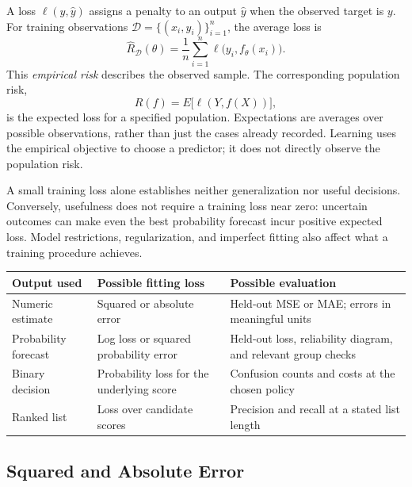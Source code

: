 A loss $\ell(y,\hat y)$ assigns a penalty to an output $\hat y$ when the observed target is $y$. For training observations $\mathcal D=\{(x_i,y_i)\}_{i=1}^n$, the average loss is
\[
\hat R_{\mathcal D}(\theta)=\frac1n\sum_{i=1}^n
\ell\bigl(y_i,f_\theta(x_i)\bigr).
\]
This \emph{empirical risk} describes the observed sample. The corresponding population risk,
\[
R(f)=E\bigl[\ell(Y,f(X))\bigr],
\]
is the expected loss for a specified population. Expectations are averages over possible observations, rather than just the cases already recorded. Learning uses the empirical objective to choose a predictor; it does not directly observe the population risk.

A small training loss alone establishes neither generalization nor useful decisions. Conversely, usefulness does not require a training loss near zero: uncertain outcomes can make even the best probability forecast incur positive expected loss. Model restrictions, regularization, and imperfect fitting also affect what a training procedure achieves.

\par\addvspace{\intextsep}\noindent\begin{minipage}{\linewidth}
\centering
\small
\setlength{\tabcolsep}{4pt}
\begin{tabular}{L{2.05cm}L{3.44cm}L{4.59cm}}
\toprule
Output used & Possible fitting loss & Possible evaluation\\
\midrule
Numeric estimate & Squared or absolute error & Held-out MSE or MAE; errors in meaningful units\\
Probability forecast & Log loss or squared probability error & Held-out loss, reliability diagram, and relevant group checks\\
Binary decision & Probability loss for the underlying score & Confusion counts and costs at the chosen policy\\
Ranked list & Loss over candidate scores & Precision and recall at a stated list length\\
\bottomrule
\end{tabular}
\label{tab:loss-vs-metric}
\end{minipage}\par\addvspace{\intextsep}

\subsection{Squared and Absolute Error}


